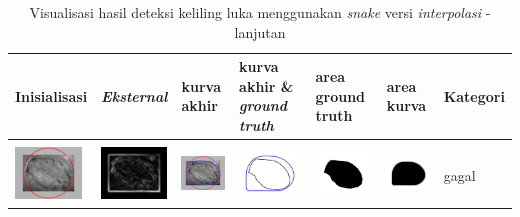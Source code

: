 \begin{table}[H]
	\centering
	\caption{Visualisasi hasil deteksi keliling luka menggunakan \emph{snake} versi \emph{interpolasi} - lanjutan}
	\label{tabel_hasil_7_interp}
	\begin{tabular}{|m{0.7in}|m{0.7in}|m{0.7in}|m{0.7in}|m{0.7in}|m{0.7in}|m{0.7in}|}
		\hline
		\textbf{Inisialisasi} & \textbf{\emph{Eksternal}} & \textbf{kurva akhir} & \textbf{kurva akhir \& \emph{ground truth}}& \textbf{area ground truth} & \textbf{area kurva} & \textbf{Kategori} \\
		\hline
		
		&  &  & & & &  \\
		\includegraphics[width=0.7in]{dataset/dataset_3/luka_kuning/ready/16_interp_init.jpg}&
		\includegraphics[width=0.7in]{dataset/dataset_3/luka_kuning/ready/16_interp_ext.jpg}&
		\includegraphics[width=0.7in]{dataset/dataset_3/luka_kuning/ready/16_interp_result.jpg}&
		\includegraphics[width=0.7in]{dataset/dataset_3/luka_kuning/ready/16_gt_r.jpg}&
		\includegraphics[width=0.7in]{dataset/dataset_3/luka_kuning/ready/16_r.jpg}&
		\includegraphics[width=0.7in]{dataset/dataset_3/luka_kuning/ready/16_interp_r.jpg}&
		gagal\\
		\hline		
	\end{tabular}
\end{table}

